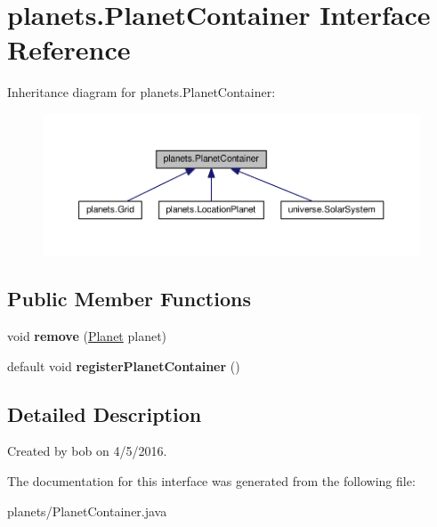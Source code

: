 \hypertarget{interfaceplanets_1_1_planet_container}{}\section{planets.\+Planet\+Container Interface Reference}
\label{interfaceplanets_1_1_planet_container}


Inheritance diagram for planets.\+Planet\+Container\+:\nopagebreak
\begin{figure}[H]
\begin{center}
\leavevmode
\includegraphics[width=350pt]{interfaceplanets_1_1_planet_container__inherit__graph}
\end{center}
\end{figure}
\subsection*{Public Member Functions}
\begin{DoxyCompactItemize}
\item 
void {\bfseries remove} (\hyperlink{classplanets_1_1_planet}{Planet} planet)\hypertarget{interfaceplanets_1_1_planet_container_aa62905532335bfc0cd9e94eb1ac15b82}{}\label{interfaceplanets_1_1_planet_container_aa62905532335bfc0cd9e94eb1ac15b82}

\item 
default void {\bfseries register\+Planet\+Container} ()\hypertarget{interfaceplanets_1_1_planet_container_a79923a53191d33aaea87af891b4a5837}{}\label{interfaceplanets_1_1_planet_container_a79923a53191d33aaea87af891b4a5837}

\end{DoxyCompactItemize}


\subsection{Detailed Description}
Created by bob on 4/5/2016. 

The documentation for this interface was generated from the following file\+:\begin{DoxyCompactItemize}
\item 
planets/Planet\+Container.\+java\end{DoxyCompactItemize}

